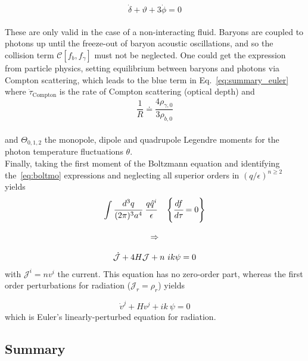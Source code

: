 \begin{equation}
\dot{\delta} + \vartheta + 3 \dot{\phi} = 0
\end{equation} \\ These are only valid in the case of a non-interacting fluid. Baryons are coupled to photons up until the freeze-out of baryon acoustic oscillations, and so the collision term $\mathcal{C}[f_b, f_\gamma]$ must not be neglected. One could get the expression from particle physics, setting equilibrium between baryons and photons via Compton scattering, which leads to the blue term in Eq.~\ref{eq:summary_euler} where $\dot{\tau}_{\mathrm{Compton}}$ is the rate of Compton scattering (optical depth) and \\
\begin{equation}
\label{eq:tcl}
\frac{1}{R} \doteq \frac{4 \rho_{\gamma, 0}}{3 \rho_{b, 0}}
\end{equation} \\ and $\Theta_{0,1,2}$ the monopole, dipole and quadrupole Legendre moments for the photon temperature fluctuations $\theta$. \\

Finally, taking the first moment of the Boltzmann equation and identifying the~\ref{eq:boltmo} expressions and neglecting all superior orders in $(q/\epsilon)^{n \geqslant 2}$ yields \\

\begin{equation}
\begin{array}{c}
\displaystyle \int \cfrac{d^3 q}{(2 \pi)^3 a^4}~\cfrac{q\hat{q}^i}{\epsilon}~~~\left\{ \cfrac{d f}{d\tau} = 0 \right\} \\
\\
\Rightarrow \\
\\
\dot{\mathcal{J}} + 4 H \mathcal{J} + n~ik \psi = 0 \\
\end{array}
\end{equation} with $\mathcal{J}^i = n v^i$ the current. This equation has no zero-order part, whereas the first order perturbations for radiation ($\mathcal{J}_r = \rho_r$) yields

\begin{equation}
\dot{v}^j + H v^j + ik~\psi = 0
\end{equation} which is Euler's linearly-perturbed equation for radiation.

\subsection*{Summary}

